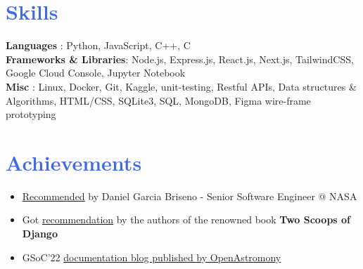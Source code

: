 \documentclass[letterpaper,11pt]{article}
\begin{document}
\section{\textcolor{RoyalBlue}{Skills}}
 \begin{itemize}[leftmargin=0in, label={}]
    \small{\item{
     \textbf{Languages}              {: Python, JavaScript, C++, C} \vspace{2pt} \\
     \textbf{Frameworks \& Libraries}{: Node.js, Express.js, React.js, Next.js, TailwindCSS, Google Cloud Console, Jupyter Notebook} \vspace{2pt} \\
     \textbf{Misc}                   {: Linux, Docker, Git, Kaggle, unit-testing, Restful APIs, Data structures \& Algorithms, HTML/CSS, SQLite3, SQL, MongoDB, Figma wire-frame prototyping} \vspace{2pt} \\
    }}
 \end{itemize}


\vspace{-15pt}
\section{\textcolor{RoyalBlue}{Achievements}}
    \begin{itemize}
      \item \href{https://drive.google.com/file/d/1QtL260MP5HumKJuxZ8roFU5Gdwqz-jeF/view?usp=share_link}{\underline{Recommended}} by Daniel Garcia Briseno - Senior Software Engineer @ NASA \vspace{-5pt}
      \item Got \href{https://drive.google.com/drive/folders/19GEpd9R-zwKNXO7kT5OF3pHWfL2tLkgR?usp=sharing}{\underline{recommendation}} by the authors of the renowned book \textbf{Two Scoops of Django} \vspace{-5pt}
      \item GSoC'22 \href{https://openastronomy.org/Universe_OA/posts/2022/09/20220908_0520_akash5100/}{\underline{documentation} blog published by OpenAstromony} \vspace{-5pt}
    \end{itemize}
\end{document}
